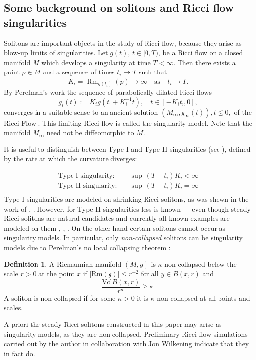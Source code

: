 \documentclass{amsart}
\theoremstyle{definition}
\newtheorem{definition}[thm]{Definition}
\theoremstyle{remark}
\numberwithin{equation}{section}
\begin{document}
\subsection{Some background on solitons and Ricci flow singularities}
Solitons are important objects in the study of Ricci flow, because they arise as blow-up limits of singularities. Let $g(t)$, $t\in[0,T)$, be a Ricci flow on a closed manifold $M$ which develops a singularity at time $T < \infty$. Then there exists a point $p \in M$ and a sequence of times $t_i \rightarrow T$ such that
$$K_i=|\mathrm{Rm}_{g(t_i)}|(p) \rightarrow \infty \quad \text{as} \quad t_i \rightarrow T.$$ 
By Perelman's work the sequence of parabolically dilated Ricci flows  
\begin{equation*}
g_i(t):= K_i g\left(t_i + K_i^{-1}t\right), \quad t \in [-K_i t_i, 0],
\end{equation*}
converges in a suitable sense to an ancient solution $(M_{\infty}, g_{\infty}(t)), t\leq 0,$ of the Ricci Flow \cite[Theorem 6.68]{ChI}. This limiting Ricci flow is called the singularity model. Note that the manifold $M_{\infty}$ need not be diffeomorphic to $M$.

It is useful to distinguish between Type I and Type II singularities (see \cite[Section 16]{Ham95}), defined by the rate at which the curvature diverges: 

\begin{align*}
\text{Type I singularity:} \quad & \sup\:(T-t_i)K_i < \infty \\
\text{Type II singularity:} \quad & \sup\: (T-t_i)K_i = \infty \\
\end{align*}
Type I singularities are modeled on shrinking Ricci solitons, as was shown in the work of \cite{N10}, \cite{EMT11}. However, for Type II singularities less is known --- even though steady Ricci solitons are natural candidates and currently all known examples are modeled on them \cite{GZ08}, \cite{AIK11}, \cite{W14}. On the other hand certain solitons cannot occur as singularity models. In particular, only \emph{non-collapsed} solitons can be singularity models due to Perelman's no local collapsing theorem \cite[Section 4]{Perl08}:
\begin{definition}
A Riemannian manifold $(M,g)$ is $\kappa$-non-collapsed below the scale $r>0$ at the point $x$ if $|\mathrm{Rm}(g)| \leq r^{-2}$ for all $y \in B(x,r)$ and 
\begin{equation*}
\frac{\text{Vol} B(x,r)}{r^n} \geq \kappa.
\end{equation*}
A soliton is non-collapsed if for some $\kappa>0$ it is $\kappa$-non-collapsed at all points and scales.
\end{definition}
A-priori the steady Ricci solitons constructed in this paper may arise as singularity models, as they are non-collapsed. Preliminary Ricci flow simulations carried out by the author in collaboration with Jon Wilkening indicate that they in fact do.  
\end{document}
